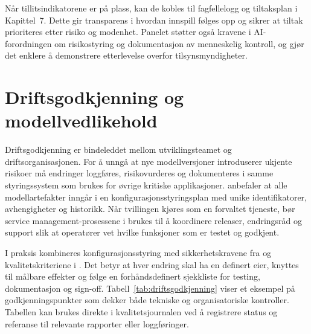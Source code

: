 Når tillitsindikatorene er på plass, kan de kobles til fagfellelogg og tiltaksplan i Kapittel~7. Dette gir transparens i hvordan innspill følges opp og sikrer at tiltak prioriteres etter risiko og modenhet. Panelet støtter også kravene i AI-forordningen om risikostyring og dokumentasjon av menneskelig kontroll, og gjør det enklere å demonstrere etterlevelse overfor tilsynsmyndigheter.

\section{Driftsgodkjenning og modellvedlikehold}
Driftsgodkjenning er bindeleddet mellom utviklingsteamet og driftsorganisasjonen. For å unngå at nye modellversjoner introduserer ukjente risikoer må endringer loggføres, risikovurderes og dokumenteres i samme styringssystem som brukes for øvrige kritiske applikasjoner. \citet{iso10007-2017} anbefaler at alle modellartefakter inngår i en konfigurasjonsstyringsplan med unike identifikatorer, avhengigheter og historikk. Når tvillingen kjøres som en forvaltet tjeneste, bør service management-prosessene i \citet{iso20000-1-2018} brukes til å koordinere releaser, endringsråd og support slik at operatører vet hvilke funksjoner som er testet og godkjent.

I praksis kombineres konfigurasjonsstyring med sikkerhetskravene fra \citet{nsm2023grunnprinsipper} og kvalitetskriteriene i \citet{dnv2023digitalassurance}. Det betyr at hver endring skal ha en definert eier, knyttes til målbare effekter og følge en forhåndsdefinert sjekkliste for testing, dokumentasjon og sign-off. Tabell~\ref{tab:driftsgodkjenning} viser et eksempel på godkjenningspunkter som dekker både tekniske og organisatoriske kontroller. Tabellen kan brukes direkte i kvalitetsjournalen ved å registrere status og referanse til relevante rapporter eller loggføringer.

